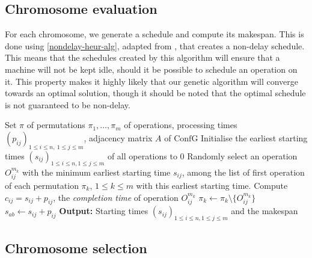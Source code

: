 \documentclass{mimosis}
\begin{document}
\subsection{Chromosome evaluation} \label{Chromosome evaluation}
For each chromosome, we generate a schedule and compute its makespan. This is done using \cref{nondelay-heur-alg}, adapted from \citep{tellache2023genetic}, that creates a non-delay schedule. This means that the schedules created by this algorithm will ensure that a machine will not be kept idle, should it be possible to schedule an operation on it. This property makes it highly likely that our genetic algorithm will converge towards an optimal solution, though it should be noted that the optimal schedule is not guaranteed to be non-delay.

\begin{algorithm}
\begin{spacing}{1.2}  %
 \label{nondelay-heur-alg}
\begin{algorithmic}[1]
\Require Set \(\pi\) of permutations \(\pi_{1}, \ldots, \pi_{m}\) of operations, processing times \((p_{ij})_{1 \leq i \leq n,\ 1 \leq j \leq m}\), adjacency matrix \(A\) of \(\text{ConfG}\)
\State Initialise the earliest starting times \((s_{ij})_{1 \leq i \leq n, 1 \leq j \leq m}\) of all operations to \(0\)
\While{\(\pi \neq \{\emptyset\}\)}
    \State Randomly select an operation \(O_{ij}^{m_k}\) with the minimum earliest starting time \(s_{ij}\), among the list of first operation of each permutation \(\pi_k\), \(1 \leq k \leq m\) with this earliest starting time.
    \State Compute \(c_{ij} = s_{ij} + p_{ij}\), the \emph{completion time} of operation \(O_{ij}^{m_k}\)
    \State \(\pi_k \gets \pi_k \setminus \{O_{ij}^{m_k}\}\)
            \State \(s_{ab} \gets s_{ij} + p_{ij}\)
        \EndIf
    \EndFor
\EndWhile
\Statex \textbf{Output:} Starting times \((s_{ij})_{1 \leq i \leq n, 1 \leq j \leq m}\) and the makespan
\end{algorithmic}
\end{spacing}
\end{algorithm}

\subsection{Chromosome selection}
\end{document}
